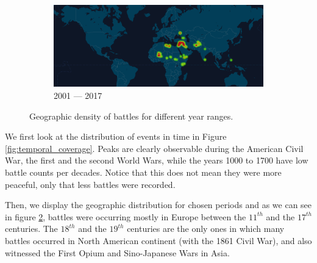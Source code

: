 \begin{figure}[!t]
\begin{subfigure}[b]{0.495\linewidth}
		\centering 
		\includegraphics[width=\linewidth]{figures/2000-2018.png}
		\caption[]%
		{{\small 2001 --- 2017 }}    
		\label{fig:geodens_2000-2017}
	\end{subfigure}
	\baselineskip
	\caption{\small Geographic density of battles for different year ranges.} 
	\label{fig:geodens}
\end{figure}

We first look at the distribution of events in time in Figure \ref{fig:temporal_coverage}. Peaks are clearly observable during the American Civil War, the first and the second World Wars,  while the years 1000 to 1700 have low battle counts per decades. Notice that this does not mean they were more peaceful, only that less battles were recorded.

Then, we display the geographic distribution for chosen periods and as we can see in figure \ref{fig:geodens}, battles were occurring mostly in Europe between the $11^{th}$ and the $17^{th}$ centuries. The $18^{th}$ and the $19^{th}$ centuries are the only ones in which many battles occurred in North American continent (with the 1861 Civil War), and also witnessed the First Opium and Sino-Japanese Wars in Asia. 
